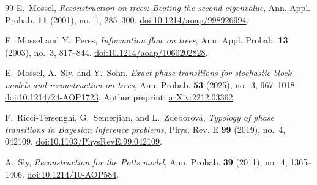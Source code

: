 \begin{thebibliography}{99}
E.~Mossel,
\emph{Reconstruction on trees: Beating the second eigenvalue},
Ann. Appl. Probab. \textbf{11} (2001), no.~1, 285--300.
\href{https://doi.org/10.1214/aoap/998926994}{doi:10.1214/aoap/998926994}.

E.~Mossel and Y.~Peres,
\emph{Information flow on trees},
Ann. Appl. Probab. \textbf{13} (2003), no.~3, 817--844.
\href{https://doi.org/10.1214/aoap/1060202828}{doi:10.1214/aoap/1060202828}.

E.~Mossel, A.~Sly, and Y.~Sohn,
\emph{Exact phase transitions for stochastic block models and
reconstruction on trees},
Ann. Probab. \textbf{53} (2025), no.~3, 967--1018.
\href{https://doi.org/10.1214/24-AOP1723}{doi:10.1214/24-AOP1723}.
Author preprint:
\href{https://arxiv.org/abs/2212.03362}{arXiv:2212.03362}.

F.~Ricci-Tersenghi, G.~Semerjian, and L.~Zdeborov\'a,
\emph{Typology of phase transitions in Bayesian inference problems},
Phys. Rev. E \textbf{99} (2019), no.~4, 042109.
\href{https://doi.org/10.1103/PhysRevE.99.042109}{doi:10.1103/PhysRevE.99.042109}.

A.~Sly,
\emph{Reconstruction for the Potts model},
Ann. Probab. \textbf{39} (2011), no.~4, 1365--1406.
\href{https://doi.org/10.1214/10-AOP584}{doi:10.1214/10-AOP584}.

\end{thebibliography}
